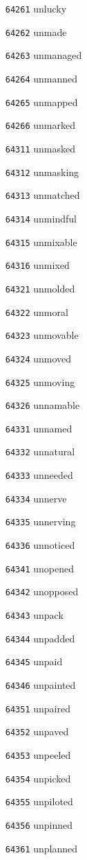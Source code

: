 \documentclass[twoside,11pt]{article}
\begin{document}
\begin{multicols}{5}
\begin{enumerate}
\item[\texttt{64261}] unlucky
\item[\texttt{64262}] unmade
\item[\texttt{64263}] unmanaged
\item[\texttt{64264}] unmanned
\item[\texttt{64265}] unmapped
\item[\texttt{64266}] unmarked
\item[\texttt{64311}] unmasked
\item[\texttt{64312}] unmasking
\item[\texttt{64313}] unmatched
\item[\texttt{64314}] unmindful
\item[\texttt{64315}] unmixable
\item[\texttt{64316}] unmixed
\item[\texttt{64321}] unmolded
\item[\texttt{64322}] unmoral
\item[\texttt{64323}] unmovable
\item[\texttt{64324}] unmoved
\item[\texttt{64325}] unmoving
\item[\texttt{64326}] unnamable
\item[\texttt{64331}] unnamed
\item[\texttt{64332}] unnatural
\item[\texttt{64333}] unneeded
\item[\texttt{64334}] unnerve
\item[\texttt{64335}] unnerving
\item[\texttt{64336}] unnoticed
\item[\texttt{64341}] unopened
\item[\texttt{64342}] unopposed
\item[\texttt{64343}] unpack
\item[\texttt{64344}] unpadded
\item[\texttt{64345}] unpaid
\item[\texttt{64346}] unpainted
\item[\texttt{64351}] unpaired
\item[\texttt{64352}] unpaved
\item[\texttt{64353}] unpeeled
\item[\texttt{64354}] unpicked
\item[\texttt{64355}] unpiloted
\item[\texttt{64356}] unpinned
\item[\texttt{64361}] unplanned

\end{enumerate}
\end{multicols}
\end{document}

